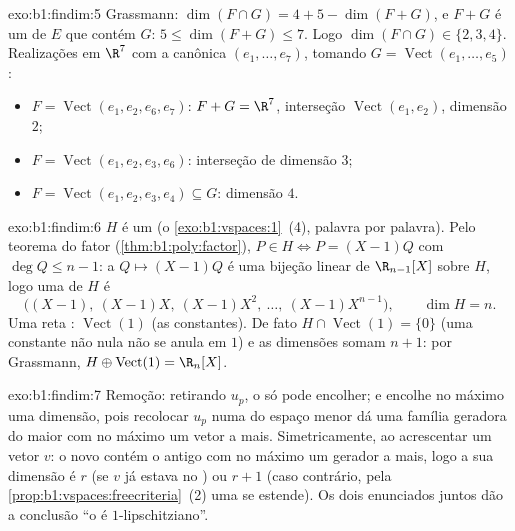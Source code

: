 \begin{solution}{exo:b1:findim:5}
Grassmann: $\dim(F \cap G) = 4 + 5 - \dim(F + G)$, e $F + G$ é um  de $E$ que contém $G$:
$5 \leq \dim(F+G) \leq 7$. Logo $\dim(F \cap G) \in \{2, 3, 4\}$. Realizações em $\R^7$ com a  canônica
$(e_1, \dots, e_7)$, tomando $G =
\operatorname{Vect}(e_1, \dots, e_5)$:
\begin{itemize}
  \item $F = \operatorname{Vect}(e_1, e_2, e_6, e_7)$: $F + G = \R^7$, interseção $\operatorname{Vect}(e_1, e_2)$, dimensão $2$;
  \item $F = \operatorname{Vect}(e_1, e_2, e_3, e_6)$: interseção de dimensão $3$;
  \item $F = \operatorname{Vect}(e_1, e_2, e_3, e_4) \subseteq G$: dimensão $4$.
\end{itemize}
\end{solution}

\begin{solution}{exo:b1:findim:6}
$H$ é um  (o \cref{exo:b1:vspaces:1}~(4), palavra por palavra). Pelo
teorema do fator (\cref{thm:b1:poly:factor}), $P \in H \iff P =
(X-1)Q$ com $\deg Q \leq n - 1$: a  $Q \mapsto (X-1)Q$ é uma
bijeção linear de $\R_{n-1}[X]$ sobre $H$, logo uma  de $H$ é
\[
\bigl((X-1),\ (X-1)X,\ (X-1)X^2,\ \dots,\ (X-1)X^{n-1}\bigr),
\qquad \dim H = n .
\]
Uma reta : $\operatorname{Vect}(1)$ (as constantes). De fato $H \cap \operatorname{Vect}(1) = \{0\}$ (uma
constante não nula não se anula em $1$) e as dimensões somam
$n + 1$: por Grassmann, $H
\oplus \operatorname{Vect}(1) = \R_n[X]$.
\end{solution}

\begin{solution}{exo:b1:findim:7}
Remoção: retirando $u_p$, o  só pode encolher; e
encolhe no máximo uma dimensão, pois recolocar $u_p$ numa  do
espaço menor dá uma família geradora do maior com no máximo um
vetor a mais. Simetricamente, ao acrescentar um vetor $v$: o novo
 contém o antigo com no máximo um gerador a mais,
logo a sua dimensão é $r$ (se $v$ já estava no ) ou
$r + 1$ (caso contrário, pela \cref{prop:b1:vspaces:freecriteria}~(2) uma  se estende). Os
dois enunciados juntos dão a conclusão ``o  é
$1$-lipschitziano''.
\end{solution}

